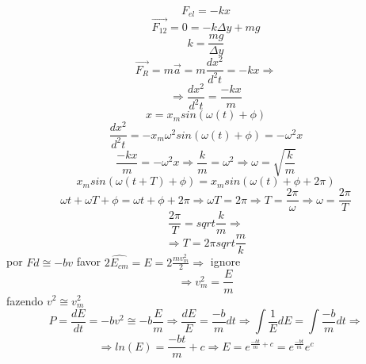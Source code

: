 \documentclass[a4paper,12pt]{article}
\begin{document}
\begin{equation}
F_{el}=-kx
\end{equation}
\begin{equation}
\vec{F_{12}}=0=-k\Delta y+mg
\end{equation}
\begin{equation}
k=\frac{mg}{\Delta y}
\end{equation}
\begin{equation}
\vec{F_R}=m\vec{a}=m\frac{dx^2}{d^2t}=-kx \Rightarrow
\end{equation}
\begin{equation}
\Rightarrow \frac{dx^2}{d^2t}=\frac{-kx}{m}
\end{equation}
\begin{equation}
x=x_msin(\omega (t)+\phi)
\end{equation}
\begin{equation}
\frac{dx^2}{d^2t}=-x_m\omega ^2sin(\omega (t)+\phi)=-\omega ^2x
\end{equation}
\begin{equation}
\frac{-kx}{m}=-\omega ^2x\Rightarrow \frac{k}{m}=\omega ^2 \Rightarrow \omega=\sqrt{\frac{k}{m}}
\end{equation}
\begin{equation}
x_msin(\omega (t+T)+\phi)=x_msin(\omega (t)+\phi +2\pi)
\end{equation}
\begin{equation}
\omega t+\omega T+\phi =\omega t+\phi +2\pi\Rightarrow \omega T=2\pi
\Rightarrow T=\frac{2\pi}{\omega} \Rightarrow \omega=\frac{2\pi}{T}
\end{equation}
\begin{equation}
\frac{2\pi}{T}=sqrt{\frac{k}{m}}\Rightarrow
\end{equation}
\begin{equation}
\Rightarrow T=2\pi sqrt{\frac{m}{k}}
\end{equation}
por $Fd\cong -bv$ favor $2\hat{E_{cm}}=E=2\frac{mv_m^2}{2} \Rightarrow$ ignore
\begin{equation}
\Rightarrow v_m^2=\frac{E}{m}
\end{equation}
fazendo $v^2\cong v_m^2$
\begin{equation}
P=\frac{dE}{dt}=-bv^2\cong -b\frac{E}{m}\Rightarrow \frac{dE}{E}=\frac{-b}{m}
dt \Rightarrow \int \frac{1}{E}dE =\int \frac{-b}{m}dt \Rightarrow
\end{equation}
\begin{equation}
\Rightarrow ln(E)=\frac{-bt}{m}+c\Rightarrow E=e^{\frac{-bt}{m}+c}=e^{\frac{-bt}{m}}e^c
\end{equation}
\end{document}
